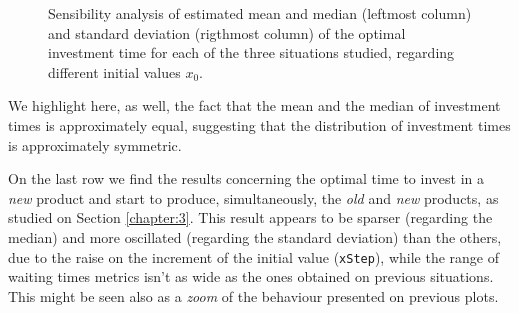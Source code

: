 \begin{figure}[!ht]
\begin{subfigmatrix}{6}
	\end{subfigmatrix}
	\caption{Sensibility analysis of estimated mean and median (leftmost column) and standard deviation (rigthmost column) of the optimal investment time for each of the three situations studied, regarding different initial values $x_0$.}
	\label{fig:stoptime_1}
\end{figure}

We highlight here, as well, the fact that the mean and the median of investment times is approximately equal, suggesting that the distribution of investment times is approximately symmetric.

On the last row we find the results concerning the optimal time to invest in a \textit{new} product and start to produce, simultaneously, the \textit{old} and \textit{new} products, as studied on Section \ref{chapter:3}. This result appears to be sparser (regarding the median) and more oscillated (regarding the standard deviation) than the others, due to the raise on the increment of the initial value (\texttt{xStep}), while the range of waiting times metrics isn't as wide as the ones obtained on previous situations. This might be seen also as a \textit{zoom} of the behaviour presented on previous plots.


